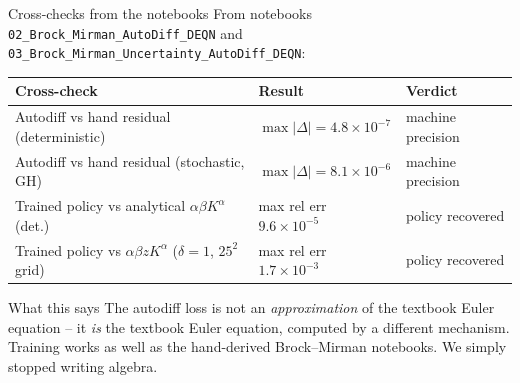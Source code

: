 \documentclass[aspectratio=169,11pt]{beamer}
\begin{document}
\begin{frame}[fragile]{Cross-checks from the notebooks}
\footnotesize From notebooks \texttt{02\_Brock\_Mirman\_AutoDiff\_DEQN} and \texttt{03\_Brock\_Mirman\_Uncertainty\_AutoDiff\_DEQN}:
\vspace{2pt}
\begin{center}
\renewcommand{\arraystretch}{1.15}
\begin{tabular}{p{6.4cm} p{3.5cm} p{2.8cm}}
\toprule
\textbf{Cross-check} & \textbf{Result} & \textbf{Verdict} \\
\midrule
Autodiff vs hand residual (deterministic) & $\max|\Delta| = 4.8\!\times\!10^{-7}$ & machine precision \\
Autodiff vs hand residual (stochastic, GH) & $\max|\Delta| = 8.1\!\times\!10^{-6}$ & machine precision \\
Trained policy vs analytical $\alpha\beta K^\alpha$ (det.) & max rel err $9.6\!\times\!10^{-5}$ & policy recovered \\
Trained policy vs $\alpha\beta z K^\alpha$ ($\delta\!=\!1$, $25^2$ grid) & max rel err $1.7\!\times\!10^{-3}$ & policy recovered \\
\bottomrule
\end{tabular}
\end{center}
\vspace{4pt}
\begin{block}{What this says}
\footnotesize The autodiff loss is not an \emph{approximation} of the textbook Euler equation -- it \emph{is} the textbook Euler equation, computed by a different mechanism. Training works as well as the hand-derived Brock--Mirman notebooks. We simply stopped writing algebra.
\end{block}
\end{frame}
\end{document}
